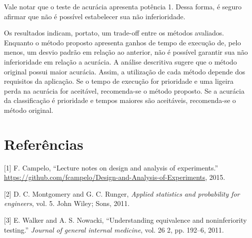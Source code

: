 \documentclass[]{article}
\begin{document}
Vale notar que o teste de acurácia apresenta potência 1. Dessa forma, é
seguro afirmar que não é possível estabelecer sua não inferioridade.

Os resultados indicam, portato, um trade-off entre os métodos avaliados.
Enquanto o método proposto apresenta ganhos de tempo de execução de,
pelo menos, um desvio padrão em relação ao anterior, não é possível
garantir sua não inferioridade em relação a acurácia. A análise
descritiva sugere que o método original possui maior acurácia. Assim, a
utilização de cada método depende dos requisitos da aplicação. Se o
tempo de execução for prioridade e uma ligeira perda na acurácia for
aceitável, recomenda-se o método proposto. Se a acurácia da
classificação é prioridade e tempos maiores são aceitáveis, recomenda-se
o método original.

\section*{Referências}\label{referencias}

\hypertarget{refs}{}
\hypertarget{ref-Campelo2015-01}{}
{[}1{]} F. Campelo, ``Lecture notes on design and analysis of
experiments.''
\url{https://github.com/fcampelo/Design-and-Analysis-of-Experiments},
2015.

\hypertarget{ref-MontgomeryRunger2011}{}
{[}2{]} D. C. Montgomery and G. C. Runger, \emph{Applied statistics and
probability for engineers}, vol. 5. John Wiley; Sons, 2011.

\hypertarget{ref-Walker2011UnderstandingEA}{}
{[}3{]} E. Walker and A. S. Nowacki, ``Understanding equivalence and
noninferiority testing.'' \emph{Journal of general internal medicine},
vol. 26 2, pp. 192--6, 2011.
\end{document}
